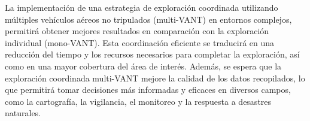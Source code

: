 \documentclass[sigconf]{acmart}
\begin{document}
La implementación de una estrategia de exploración coordinada utilizando múltiples vehículos aéreos no tripulados (multi-VANT) en entornos complejos, permitirá obtener mejores resultados en comparación con la exploración individual (mono-VANT). Esta coordinación eﬁciente se traducirá en una reducción del tiempo y los recursos necesarios para completar la exploración, así como en una mayor cobertura del área de interés. Además, se espera que la exploración coordinada multi-VANT mejore la calidad de los datos recopilados, lo que permitirá tomar decisiones más informadas y eﬁcaces en diversos campos, como la cartografía, la vigilancia, el monitoreo y la respuesta a desastres naturales.






\end{document}
